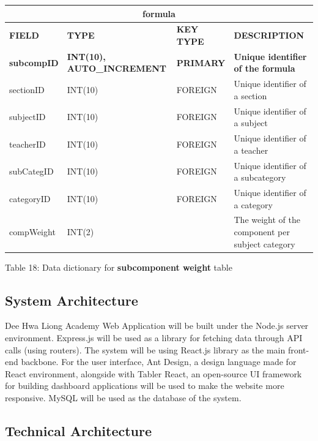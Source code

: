 \documentclass[11pt,a4paper,titlepage]{article}
\begin{document}
\vspace{1cm}
\begin{longtable}{ |p{2.5cm}|p{4.5cm}|p{2.5cm}|p{3cm}|  }
    \hline
    \multicolumn{4}{|c|}{\textbf{formula}} \\
    \hline
    \textbf{FIELD}&\textbf{TYPE}&\textbf{KEY TYPE}&\textbf{DESCRIPTION}\\
    \hline
    \textbf{subcompID}  & \textbf{INT(10), AUTO\_INCREMENT} & \textbf{PRIMARY} & \textbf{Unique identifier of the formula}\\ \hline
    sectionID & INT(10) & FOREIGN & Unique identifier of a section\\ \hline
    subjectID & INT(10) & FOREIGN & Unique identifier of a subject\\ \hline
    teacherID & INT(10) & FOREIGN & Unique identifier of a teacher\\ \hline
    subCategID & INT(10) & FOREIGN & Unique identifier of a subcategory\\ \hline
    categoryID & INT(10) & FOREIGN & Unique identifier of a category\\ \hline
    compWeight & INT(2) & & The weight of the component per subject category\\ \hline

\end{longtable}

\vspace{.5cm}
\begin{center}
    Table 18: Data dictionary for \textbf{subcomponent weight} table
\end{center}

\newpage

\subsection{System Architecture}

Dee Hwa Liong Academy Web Application will be built under the Node.js server environment. Express.js will be used as a library for fetching data through API calls (using routers). The system will be using React.js library as the main front-end backbone. For the user interface, Ant Design, a design language made for React environment, alongside with Tabler React, an open-source UI framework for building dashboard applications will be used to make the website more responsive. MySQL will be used as the database of the system.

\subsection{Technical Architecture}
\end{document}
